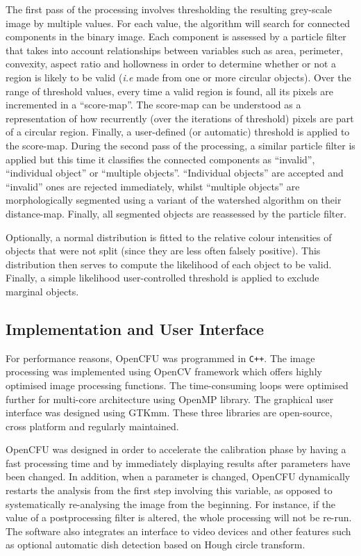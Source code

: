 \documentclass[10pt]{article}
\begin{document}
The first pass of the processing involves thresholding the resulting grey-scale
image by multiple values.
For each value, the algorithm will search for connected components in the binary
image.
Each component is assessed by a particle filter that takes into account relationships
between variables such as area, perimeter, convexity, aspect ratio and
hollowness in order to determine whether or not a region is likely to be valid 
(\emph{i.e} made from one or more circular objects).
Over the range of threshold values, every time a valid region is found, all
its pixels are incremented in a ``score-map''.
The score-map can be understood as a representation of how recurrently (over the
iterations of threshold) pixels are part of a circular region. Finally,  a
user-defined (or automatic) threshold is applied to the score-map.
During the second pass of the processing, a similar particle filter is applied
but this time it classifies the connected components as ``invalid'',
``individual object'' or ``multiple objects''.
``Individual objects'' are accepted and ``invalid'' ones  are rejected
immediately, whilst ``multiple objects'' are morphologically segmented using a variant
of the watershed algorithm on their distance-map\cite{marotz_effective_2001}.
Finally, all segmented objects are reassessed by the particle filter.

Optionally, a normal distribution is fitted to the relative colour intensities of
objects that were not split (since they are less often falsely positive). This
distribution then serves to compute the likelihood of each object to be valid.
Finally, a simple likelihood user-controlled threshold is applied to exclude
marginal objects.


 \subsection*{Implementation and User Interface} For performance reasons, OpenCFU was
programmed in \texttt{C++}. The image processing was implemented using OpenCV framework\cite{opencv_library}
 which offers highly optimised image processing functions.
The time-consuming loops were optimised further for multi-core architecture using
OpenMP library\cite{openmp11}. The graphical user interface was designed using GTKmm.
These three libraries are open-source, cross platform and regularly maintained.

OpenCFU was designed in order to accelerate the calibration phase by having a
fast processing time and by immediately displaying results after parameters have
been changed. In addition, when a parameter is changed, OpenCFU dynamically restarts the analysis from
the first step involving this variable, as opposed to systematically re-analysing the image
from 
the beginning. For instance, if the value of a postprocessing filter is altered, the whole processing will not be re-run.
The software also integrates an interface to video
devices and
other features such as optional
automatic dish detection based on Hough circle transform.
\end{document}
